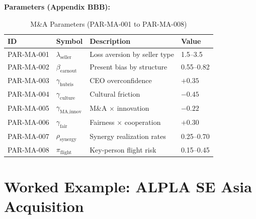 \textbf{Parameters (Appendix BBB):}
\begin{table}[htbp]
\centering
\caption{M\&A Parameters (PAR-MA-001 to PAR-MA-008)}
\label{tab:ma-params}
\begin{tabular}{llll}
\toprule
\textbf{ID} & \textbf{Symbol} & \textbf{Description} & \textbf{Value} \\
\midrule
PAR-MA-001 & $\lambda_{\text{seller}}$ & Loss aversion by seller type & 1.5--3.5 \\
PAR-MA-002 & $\beta_{\text{earnout}}$  & Present bias by structure    & 0.55--0.82 \\
PAR-MA-003 & $\gamma_{\text{hubris}}$  & CEO overconfidence           & $+0.35$ \\
PAR-MA-004 & $\gamma_{\text{culture}}$ & Cultural friction            & $-0.45$ \\
PAR-MA-005 & $\gamma_{\text{MA,innov}}$& M\&A $\times$ innovation     & $-0.22$ \\
PAR-MA-006 & $\gamma_{\text{fair}}$    & Fairness $\times$ cooperation & $+0.30$ \\
PAR-MA-007 & $\rho_{\text{synergy}}$   & Synergy realization rates    & 0.25--0.70 \\
PAR-MA-008 & $\pi_{\text{flight}}$     & Key-person flight risk       & 0.15--0.45 \\
\bottomrule
\end{tabular}
\end{table}


\section{Worked Example: ALPLA SE Asia Acquisition}
\label{sec:ma-example}

